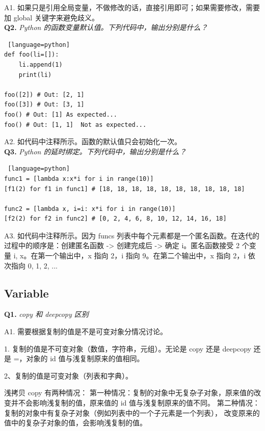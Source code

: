 \documentclass[cn,10pt,math=newtx,citestyle=gb7714-2015,bibstyle=gb7714-2015]{elegantbook}
\begin{document}
A1. 如果只是引用全局变量，不做修改的话，直接引用即可；如果需要修改，需要加 global 关键字来避免歧义。\\

\textbf{Q2.} \textit{Python 的函数变量默认值。下列代码中，输出分别是什么？}

\begin{lstlisting} [language=python]
def foo(li=[]):
    li.append(1)
    print(li)

foo([2]) # Out: [2, 1]
foo([3]) # Out: [3, 1]
foo() # Out: [1] As expected...
foo() # Out: [1, 1]  Not as expected...
\end{lstlisting}

A2. 如代码中注释所示。函数的默认值只会初始化一次。\\


\textbf{Q3.} \textit{Python 的延时绑定。下列代码中，输出分别是什么？}

\begin{lstlisting} [language=python]
func1 = [lambda x:x*i for i in range(10)] 
[f1(2) for f1 in func1] # [18, 18, 18, 18, 18, 18, 18, 18, 18, 18]

func2 = [lambda x, i=i: x*i for i in range(10)]
[f2(2) for f2 in func2] # [0, 2, 4, 6, 8, 10, 12, 14, 16, 18] 
\end{lstlisting}

A3. 如代码中注释所示。因为 funcs 列表中每个元素都是一个匿名函数。在迭代的过程中的顺序是：创建匿名函数 -> 创建完成后 -> 确定 i。匿名函数接受 2 个变量 i, x。在第一个输出中，x 指向 2，i 指向 9。在第二个输出中，x 指向 2，i 依次指向 0, 1, 2, ...\\


\subsection{Variable}

\textbf{Q1.} \textit{copy 和 deepcopy 区别}

A1. 需要根据复制的值是不是可变对象分情况讨论。

1. 复制的值是不可变对象（数值，字符串，元组）。无论是 copy 还是 deepcopy 还是 =，对象的 id 值与浅复制原来的值相同。

2、复制的值是可变对象（列表和字典）。

浅拷贝 copy 有两种情况：
第一种情况：复制的对象中无复杂子对象，原来值的改变并不会影响浅复制的值，原来值的 id 值与浅复制原来的值不同。
第二种情况：复制的对象中有复杂子对象（例如列表中的一个子元素是一个列表）， 改变原来的值中的复杂子对象的值，会影响浅复制的值。
\end{document}

